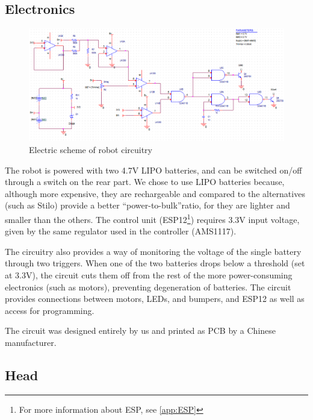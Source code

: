 \documentclass[a4paper,twoside]{book}
\begin{document}
\subsection{Electronics}

\begin{figure}[h]
\includegraphics[width=\textwidth]{img/ProgettoCircuito.eps}
\caption{Electric scheme of robot circuitry}
\label{fig:robot_circ}
\end{figure}

The robot is powered with two 4.7V LIPO batteries, and can be switched on/off through a switch on the rear part. We chose to use LIPO batteries because, although more expensive, they are rechargeable and \textemdash compared to the alternatives (such as Stilo) \textemdash provide a better \textquotedblleft power-to-bulk\textquotedblright  ratio, for they are lighter and smaller than the others.
The control unit (ESP12\footnote{For more information about ESP, see \autoref{app:ESP}}) requires 3.3V input voltage, given by the same regulator used in the controller (AMS1117).

The circuitry also provides a way of monitoring the voltage of the single battery through two triggers. When one of the two batteries drops below a threshold (set at 3.3V), the circuit cuts them off from the rest of the more power-consuming electronics (such as motors), preventing degeneration of batteries. The circuit provides connections between motors, LEDs, and bumpers, and ESP12 as well as access for programming.

The circuit was designed entirely by us and printed as PCB by a Chinese manufacturer.

\subsection{Head}
\end{document}
